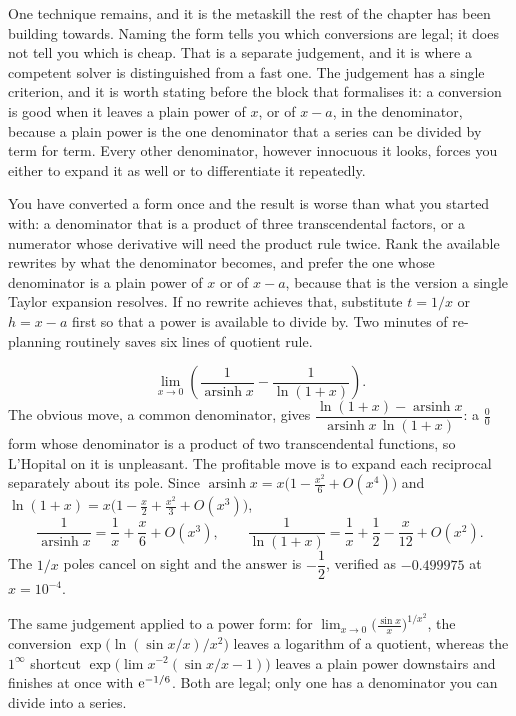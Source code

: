 One technique remains, and it is the metaskill the rest of the chapter has been building towards. Naming the form tells you which conversions are legal; it does not tell you which is cheap. That is a separate judgement, and it is where a competent solver is distinguished from a fast one. The judgement has a single criterion, and it is worth stating before the block that formalises it: a conversion is good when it leaves a plain power of $x$, or of $x-a$, in the denominator, because a plain power is the one denominator that a series can be divided by term for term. Every other denominator, however innocuous it looks, forces you either to expand it as well or to differentiate it repeatedly.

\cue You have converted a form once and the result is worse than what you started with: a denominator that is a product of three transcendental factors, or a numerator whose derivative will need the product rule twice.
\method Rank the available rewrites by what the denominator becomes, and prefer the one whose denominator is a plain power of $x$ or of $x-a$, because that is the version a single Taylor expansion resolves. If no rewrite achieves that, substitute $t=1/x$ or $h=x-a$ first so that a power is available to divide by. Two minutes of re-planning routinely saves six lines of quotient rule.

\begin{worked}
\[
\lim_{x\to0}\left(\frac{1}{\operatorname{arsinh}x}-\frac{1}{\ln(1+x)}\right).
\]
The obvious move, a common denominator, gives $\dfrac{\ln(1+x)-\operatorname{arsinh}x}{\operatorname{arsinh}x\,\ln(1+x)}$: a $\tfrac00$ form whose denominator is a product of two transcendental functions, so L'Hopital on it is unpleasant. The profitable move is to expand each reciprocal separately about its pole. Since $\operatorname{arsinh}x=x\bigl(1-\tfrac{x^{2}}{6}+O(x^{4})\bigr)$ and $\ln(1+x)=x\bigl(1-\tfrac{x}{2}+\tfrac{x^{2}}{3}+O(x^{3})\bigr)$,
\[
\frac{1}{\operatorname{arsinh}x}=\frac1x+\frac{x}{6}+O(x^{3}),\qquad
\frac{1}{\ln(1+x)}=\frac1x+\frac12-\frac{x}{12}+O(x^{2}).
\]
The $1/x$ poles cancel on sight and the answer is $-\dfrac12$, verified as $-0.499975$ at $x=10^{-4}$.

The same judgement applied to a power form: for $\lim_{x\to0}\bigl(\tfrac{\sin x}{x}\bigr)^{1/x^{2}}$, the conversion $\exp\bigl(\ln(\sin x/x)/x^{2}\bigr)$ leaves a logarithm of a quotient, whereas the $1^{\infty}$ shortcut $\exp\bigl(\lim x^{-2}(\sin x/x-1)\bigr)$ leaves a plain power downstairs and finishes at once with $\mathrm{e}^{-1/6}$. Both are legal; only one has a denominator you can divide into a series.
\end{worked}

